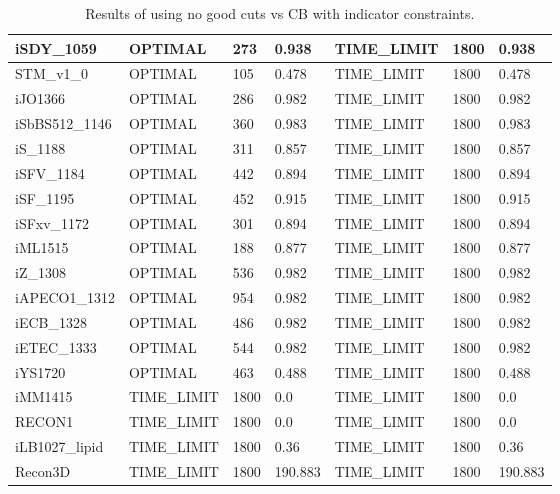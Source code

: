 \begin{table}[!ht]
\begin{tabular}{|l|l|l|l|l|l|l|}
        iSDY\_1059 & OPTIMAL & 273 & 0.938 & TIME\_LIMIT & 1800 & 0.938 \\ \hline
        STM\_v1\_0 & OPTIMAL & 105 & 0.478 & TIME\_LIMIT & 1800 & 0.478 \\ \hline
        iJO1366 & OPTIMAL & 286 & 0.982 & TIME\_LIMIT & 1800 & 0.982 \\ \hline
        iSbBS512\_1146 & OPTIMAL & 360 & 0.983 & TIME\_LIMIT & 1800 & 0.983 \\ \hline
        iS\_1188 & OPTIMAL & 311 & 0.857 & TIME\_LIMIT & 1800 & 0.857 \\ \hline
        iSFV\_1184 & OPTIMAL & 442 & 0.894 & TIME\_LIMIT & 1800 & 0.894 \\ \hline
        iSF\_1195 & OPTIMAL & 452 & 0.915 & TIME\_LIMIT & 1800 & 0.915 \\ \hline
        iSFxv\_1172 & OPTIMAL & 301 & 0.894 & TIME\_LIMIT & 1800 & 0.894 \\ \hline
        iML1515 & OPTIMAL & 188 & 0.877 & TIME\_LIMIT & 1800 & 0.877 \\ \hline
        iZ\_1308 & OPTIMAL & 536 & 0.982 & TIME\_LIMIT & 1800 & 0.982 \\ \hline
        iAPECO1\_1312 & OPTIMAL & 954 & 0.982 & TIME\_LIMIT & 1800 & 0.982 \\ \hline
        iECB\_1328 & OPTIMAL & 486 & 0.982 & TIME\_LIMIT & 1800 & 0.982 \\ \hline
        iETEC\_1333 & OPTIMAL & 544 & 0.982 & TIME\_LIMIT & 1800 & 0.982 \\ \hline
        iYS1720 & OPTIMAL & 463 & 0.488 & TIME\_LIMIT & 1800 & 0.488 \\ \hline
        iMM1415 & TIME\_LIMIT & 1800 & 0.0 & TIME\_LIMIT & 1800 & 0.0 \\ \hline
        RECON1 & TIME\_LIMIT & 1800 & 0.0 & TIME\_LIMIT & 1800 & 0.0 \\ \hline
        iLB1027\_lipid & TIME\_LIMIT & 1800 & 0.36 & TIME\_LIMIT & 1800 & 0.36 \\ \hline
        Recon3D & TIME\_LIMIT & 1800 & 190.883 & TIME\_LIMIT & 1800 & 190.883 \\ \hline
    \end{tabular}
    \caption{\label{Tab:cb_vs_ngc_indicator} Results of using no good cuts vs CB with indicator constraints.}
\end{table}

